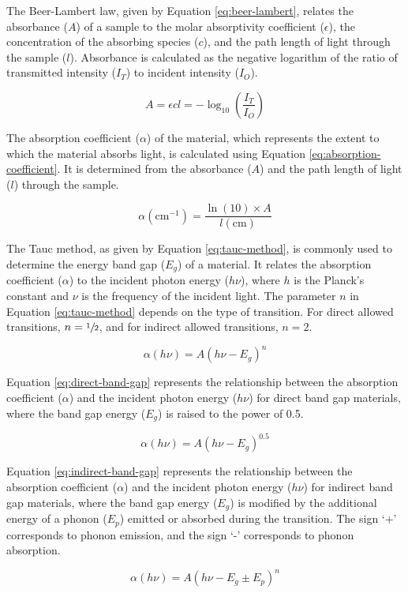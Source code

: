 		The Beer-Lambert law, given by Equation \ref{eq:beer-lambert}, relates the absorbance ($A$) of a sample to the molar absorptivity coefficient ($\epsilon$), the concentration of the absorbing species ($c$), and the path length of light through the sample ($l$). Absorbance is calculated as the negative logarithm of the ratio of transmitted intensity ($I_T$) to incident intensity ($I_O$).
		
		\begin{equation}
			\label{eq:beer-lambert}
			A=\epsilon c l=-\log_{10}\left(\frac{I_T}{I_O}\right)
		\end{equation}
		
		The absorption coefficient ($\alpha$) of the material, which represents the extent to which the material absorbs light, is calculated using Equation \ref{eq:absorption-coefficient}. It is determined from the absorbance ($A$) and the path length of light ($l$) through the sample.
		
		\begin{equation}
			\label{eq:absorption-coefficient}
			\alpha (\text{cm}^{-1})= \frac{\ln(10) \times A}{l(\text{cm})}
		\end{equation}
		
		The Tauc method, as given by Equation \ref{eq:tauc-method}, is commonly used to determine the energy band gap ($E_g$) of a material. It relates the absorption coefficient ($\alpha$) to the incident photon energy ($h\nu$), where $h$ is the Planck's constant and $\nu$ is the frequency of the incident light. The parameter $n$ in Equation \ref{eq:tauc-method} depends on the type of transition. For direct allowed transitions, $n=\sfrac{1}{2}$, and for indirect allowed transitions, $n=2$.
		
		\begin{equation}
			\label{eq:tauc-method}
			\alpha(h\nu) = A(h\nu-E_g)^n
		\end{equation}
		
		Equation \ref{eq:direct-band-gap} represents the relationship between the absorption coefficient ($\alpha$) and the incident photon energy ($h\nu$) for direct band gap materials, where the band gap energy ($E_g$) is raised to the power of 0.5.
		
		\begin{equation}
			\label{eq:direct-band-gap}
			\alpha(h\nu) = A(h\nu-E_g)^{0.5}
		\end{equation}
		
		Equation \ref{eq:indirect-band-gap} represents the relationship between the absorption coefficient ($\alpha$) and the incident photon energy ($h\nu$) for indirect band gap materials, where the band gap energy ($E_g$) is modified by the additional energy of a phonon ($E_p$) emitted or absorbed during the transition. The sign `+' corresponds to phonon emission, and the sign `-' corresponds to phonon absorption.
		
		\begin{equation}
			\label{eq:indirect-band-gap}
			\alpha(h\nu) = A(h\nu-E_g\pm E_p)^n
		\end{equation}
